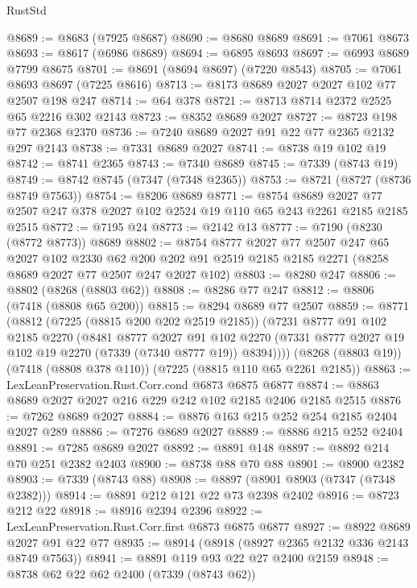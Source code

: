 \begin{lexlean}{RustStd}
\begin{coremodule}
@8689 := @8683 (@7925 @8687)
@8690 := @8680 @8689
@8691 := @7061 @8673
@8693 := @8617 (@6986 @8689)
@8694 := @6895 @8693
@8697 := @6993 @8689 @7799 @8675
@8701 := @8691 (@8694 @8697) (@7220 @8543)
@8705 := @7061 @8693 @8697 (@7225 @8616)
@8713 := @8173 @8689 @2027 @2027 @102 @77 @2507 @198 @247
@8714 := @64 @378
@8721 := @8713 @8714 @2372 @2525 @65 @2216 @302 @2143
@8723 := @8352 @8689 @2027
@8727 := @8723 @198 @77 @2368 @2370
@8736 := @7240 @8689 @2027 @91 @22 @77 @2365 @2132 @297 @2143
@8738 := @7331 @8689 @2027
@8741 := @8738 @19 @102 @19
@8742 := @8741 @2365
@8743 := @7340 @8689
@8745 := @7339 (@8743 @19)
@8749 := @8742 @8745 (@7347 (@7348 @2365))
@8753 := @8721 (@8727 (@8736 @8749 @7563))
@8754 := @8206 @8689
@8771 := @8754
    @8689
    @2027
    @77
    @2507
    @247
    @378
    @2027
    @102
    @2524
    @19
    @110
    @65
    @243
    @2261
    @2185
    @2185
    @2515
@8772 := @7195 @24
@8773 := @2142 @13
@8777 := @7190 (@8230 (@8772 @8773)) @8689
@8802 := @8754
    @8777
    @2027
    @77
    @2507
    @247
    @65
    @2027
    @102
    @2330
    @62
    @200
    @202
    @91
    @2519
    @2185
    @2185
    @2271
    (@8258 @8689 @2027 @77 @2507 @247 @2027 @102)
@8803 := @8280 @247
@8806 := @8802 (@8268 (@8803 @62))
@8808 := @8286 @77 @247
@8812 := @8806 (@7418 (@8808 @65 @200))
@8815 := @8294 @8689 @77 @2507
@8859 := @8771
    (@8812
      (@7225 (@8815 @200 @202 @2519 @2185))
      (@7231
        @8777
        @91
        @102
        @2185
        @2270
        (@8481
          @8777
          @2027
          @91
          @102
          @2270
          (@7331 @8777 @2027 @19 @102 @19 @2270 (@7339 (@7340 @8777 @19)) @8394))))
    (@8268 (@8803 @19))
    (@7418 (@8808 @378 @110))
    (@7225 (@8815 @110 @65 @2261 @2185))
@8863 := LexLeanPreservation.Rust.Corr.cond @6873 @6875 @6877
@8874 := @8863 @8689 @2027 @2027 @216 @229 @242 @102 @2185 @2406 @2185 @2515
@8876 := @7262 @8689 @2027
@8884 := @8876 @163 @215 @252 @254 @2185 @2404 @2027 @289
@8886 := @7276 @8689 @2027
@8889 := @8886 @215 @252 @2404
@8891 := @7285 @8689 @2027
@8892 := @8891 @148
@8897 := @8892 @214 @70 @251 @2382 @2403
@8900 := @8738 @88 @70 @88
@8901 := @8900 @2382
@8903 := @7339 (@8743 @88)
@8908 := @8897 (@8901 @8903 (@7347 (@7348 @2382)))
@8914 := @8891 @212 @121 @22 @73 @2398 @2402
@8916 := @8723 @212 @22
@8918 := @8916 @2394 @2396
@8922 := LexLeanPreservation.Rust.Corr.first @6873 @6875 @6877
@8927 := @8922 @8689 @2027 @91 @22 @77
@8935 := @8914 (@8918 (@8927 @2365 @2132 @336 @2143 @8749 @7563))
@8941 := @8891 @119 @93 @22 @27 @2400 @2159
@8948 := @8738 @62 @22 @62 @2400 (@7339 (@8743 @62))

\end{coremodule}
\end{lexlean}

